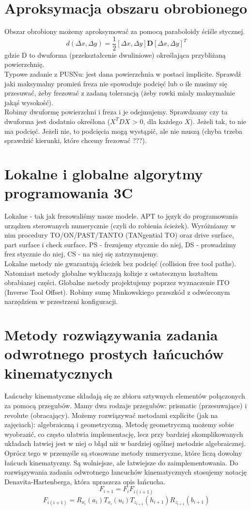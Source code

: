 \documentclass[12pt]{article}
\begin{document}
\section{Aproksymacja obszaru obrobionego}
Obszar obrobiony możemy aproksymować za pomocą paraboloidy ściśle stycznej. 
$$d(\Delta x, \Delta y) = \frac{1}{2} [\Delta x, \Delta y] \textbf{D}  [\Delta x, \Delta y]^{T}$$
gdzie D to dwuforma (przekształcenie dwuliniowe) określająca przybliżaną powierzchnię.\\
Typowe zadanie z PUSNu: jest dana powierzchnia w postaci implicite. Sprawdź jaki maksymalny promień freza nie spowoduje podcięć lub o ile musimy się przesuwać, żeby frezować z zadaną tolerancją (żeby rowki miały maksymalnie jakąś wysokość).\\
Robimy dwuformę powierzchni i freza i je odejmujemy. Sprawdzamy czy ta dwuforma jest dodatnio określona ($X^{T}DX$ > 0, dla każdego $X$). Jeżeli tak, to nie ma podcięć. Jeżeli nie, to podcięcia mogą wystąpić, ale nie muszą (chyba trzeba sprawdzić kierunki, które chcemy frezować ???).
 
 \section{Lokalne i globalne algorytmy programowania 3C}
 Lokalne - tak jak frezowaliśmy nasze modele. APT to język do programowania urządzen sterowanych numerycznie (czyli do robienia ścieżek). Wyróżniamy w nim procedury TO/ON/PAST/TANTO (TANgential TO) oraz drive surface, part surface i check surface. PS - frezujemy stycznie do niej, DS - prowadzimy frez stycznie do niej, CS - na niej się zatrzymujemy.\\
Lokalne metody nie gwarantują ścieżek bez podcięć (collision free tool paths). Natomiast metody globalne wykluczają kolizje z ostatecznym kształtem obrabianej części. Globalne metody projektujemy poprzez wyznaczenie ITO (Inverse Tool Offset). Robimy sumę Minkowskiego przeszkód z odwórconym narzędziem w przestrzeni konfiguracji.
 
 \section{Metody rozwiązywania zadania odwrotnego prostych łańcuchów kinematycznych}
 Łańcuchy kinematyczne składają się ze zbioru sztywnych elementów połączonych za pomocą przegubów. Mamy dwa rodzaje przegubów: prismatic (przesuwające) i revolute (obracający). 
 Możemy rozwiązywać metodami explicite (jak na zajęciach): algebraiczną i geometryczną. Metodę geometryczną możemy sobie wyobrazić, co często ułatwia implementację, lecz przy bardziej skomplikowanych układach łatwiej jest w niej o błąd niż w bardziej ogólnej metodzie algebraicznej.
 Oprócz tego w przemyśle są stosowane metody numeryczne, które liczą dowolny łańcuch kinematyczny. Są wolniejsze, ale łatwiejsze do zaimplementowania.
 Do rozwiązywania zadania odwrotnego łancuchów kinematycznych stosujemy notację Denavita-Hartenberga, która upraszcza opis łańcucha.
 $$F_{i+1} = F_{i}F_{i(i+1)}$$
 $$F_{i(i+1)} = R_{x_{i}}(a_{i}) T_{x_{i}}(u_{i}) T_{z_{i+1}}(h_{i+1}) R_{z_{i+1}}(b_{i+1})$$
 
\end{document}
